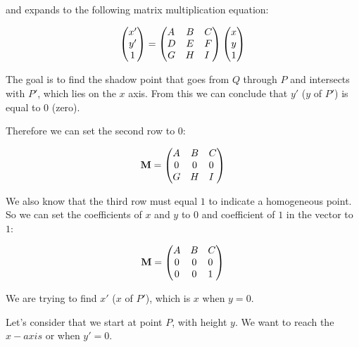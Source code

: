 \documentclass[12pt]{article}
\begin{document}
and expands to the following matrix multiplication equation:

\begin{align}
\begin{pmatrix}
x' \\
y' \\
1  
\end{pmatrix} \nonumber
&=
\begin{pmatrix}
A \hfill & B & C \\
D & E & F \hfill \\
G & H & I \hfill 
\end{pmatrix} \nonumber
\begin{pmatrix}
x \\
y \\
1  
\end{pmatrix} \nonumber \\
\end{align}


The goal is to find the shadow point that goes from $Q$ through $P$ 
and intersects with $P'$, which lies on the $x$ axis. 
From this we can conclude that $y'$ ($y$ of $P'$) is equal to 0 (zero).

Therefore we can set the second row to $0$:

\begin{align}
\textbf{M} &=
\begin{pmatrix}
A \hfill & B & C \\
0 & 0 & 0 \hfill \\
G & H & I \hfill 
\end{pmatrix} \nonumber \\
\end{align}

We also know that the third row must equal $1$ to indicate a homogeneous point.
So we can set the coefficients of $x$ and $y$ to $0$ and coefficient of $1$ in the vector to $1$:

\begin{align}
\textbf{M} &=
\begin{pmatrix}
A \hfill & B & C \\
0 & 0 & 0 \hfill \\
0 & 0 & 1 \hfill 
\end{pmatrix} \nonumber \\
\end{align}

We are trying to find $x'$ ($x$ of $P'$), which is $x$ when $y = 0$.

Let's consider that we start at point $P$, with height $y$. 
We want to reach the $x-axis$ or when $y' = 0$.
\end{document}
